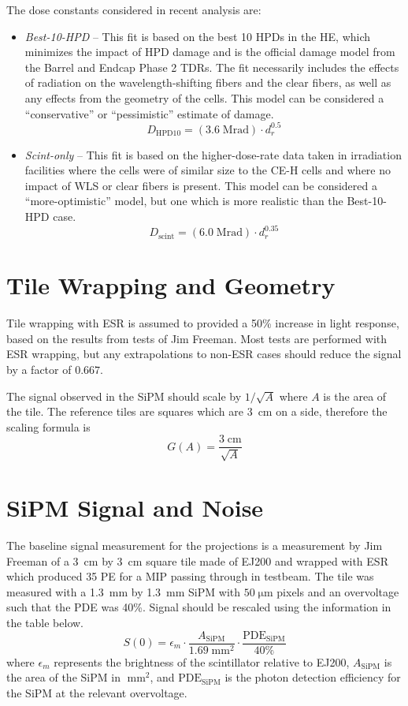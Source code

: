 \documentclass{article}[12pt]
\newcommand{\unit}[1]{\ensuremath{\mathrm{\;#1}}}
\begin{document}
The dose constants considered in recent analysis are:
\begin{itemize}
\item \emph{Best-10-HPD} -- This fit is based on the best 10 HPDs in the HE, which minimizes the impact of HPD damage and is the official damage model from the Barrel and Endcap Phase 2 TDRs.  The fit necessarily includes the effects of radiation on the wavelength-shifting fibers and the clear fibers, as well as any effects from the geometry of the cells.  This model can be considered a ``conservative'' or ``pessimistic'' estimate of damage.
  \[
  D_\mathrm{HPD10} = (3.6\unit{Mrad}) \cdot d_r^{0.5}
  \]
\item \emph{Scint-only} -- This fit is based on the higher-dose-rate data taken in irradiation facilities where the cells were of similar size to the CE-H cells and where no impact of WLS or clear fibers is present.  This model can be considered a ``more-optimistic'' model, but one which is more realistic than the Best-10-HPD case.
  \[
  D_\mathrm{scint} = (6.0\unit{Mrad}) \cdot d_r^{0.35}
  \]
\end{itemize}

\section{Tile Wrapping and Geometry}

Tile wrapping with ESR is assumed to provided a 50\% increase in light
response, based on the results from tests of Jim Freeman.  Most tests
are performed with ESR wrapping, but any extrapolations to non-ESR
cases should reduce the signal by a factor of $0.667$.

The signal observed in the SiPM should scale by $1/\sqrt{A}$ where $A$
is the area of the tile.  The reference tiles are squares which are
3~cm on a side, therefore the scaling formula is
\[
G(A) = \frac{3\unit{cm}}{\sqrt{A}}
\]

\section{SiPM Signal and Noise}

The baseline signal measurement for the projections is a measurement
by Jim Freeman of a 3~cm by 3~cm square tile made of EJ200 and wrapped
with ESR which produced 35 PE for a MIP passing through in testbeam.
The tile was measured with a 1.3~mm by 1.3~mm SiPM with $50\unit{\mu
  m}$ pixels and an overvoltage such that the PDE was 40\%.  Signal
should be rescaled using the information in the table below.
\[
S(0) = \epsilon_{m} \cdot \frac{A_\mathrm{SiPM}}{1.69\unit{mm^2}} \cdot \frac{\mathrm{PDE}_\mathrm{SiPM}}{40\%}
\]
where $\epsilon_{m}$ represents the brightness of the scintillator
relative to EJ200, $A_\mathrm{SiPM}$ is the area of the SiPM in
\unit{mm^2}, and $\mathrm{PDE}_\mathrm{SiPM}$ is the photon detection
efficiency for the SiPM at the relevant overvoltage.
\end{document}
